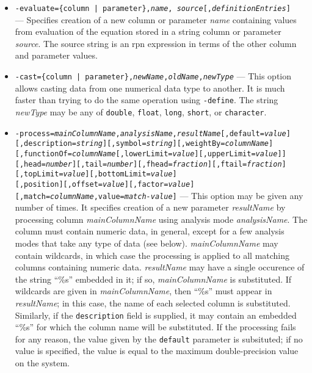 \begin{itemize}
\begin{itemize}
\begin{itemize}
        \item {\tt -evaluate=\{column | parameter\},{\em name},{\em
source}[,{\em definitionEntries}]}\\ --- Specifies creation of a new column or parameter {\em name}
containing values from evaluation of the equation stored in a string column or parameter {\em source}.
The source string is an rpn expression in terms of the other column and parameter values.

        \item {\tt -cast=\{column | parameter\},{\em newName},{\em oldName},{\em newType}} --- This option allows
casting data from one numerical data type to another.  It is much faster than trying to do the same operation using
{\tt -define}.  The string {\em newType} may be any of {\tt double}, {\tt float}, {\tt long}, {\tt short}, or
{\tt character}.

        \item {\tt -process={\em mainColumnName},{\em analysisName},{\em resultName}[,default={\em value}]}
\\{\tt [,description={\em string}][,symbol={\em string}][,weightBy={\em columnName}]}
\\{\tt [,functionOf={\em columnName}[,lowerLimit={\em value}][,upperLimit={\em value}]]}
\\{\tt [,head={\em number}][,tail={\em number}][,fhead={\em fraction}][,ftail={\em fraction}]}
\\{\tt [,topLimit={\em value}][,bottomLimit={\em value}]} 
\\{\tt [,position][,offset={\em value}][,factor={\em value}]}
\\{\tt [,match={\em columnName},value={\em match-value}]} --- This option may be given
any number of times.  It specifies creation of a new parameter {\em resultName} by processing
column {\em mainColumnName} using analysis mode {\em analysisName}.  The column must contain
numeric data, in general, except for a few analysis modes that take any type of data (see below). {\em
mainColumnName} may contain wildcards, in which case the processing is applied to all matching
columns containing numeric data.  {\em resultName} may have a single occurence of the string
``\%s'' embedded in it; if so, {\em mainColumnName} is substituted.  If wildcards are given in
{\em mainColumnName}, then ``\%s'' must appear in {\em resultName}; in this case, the name of
each selected column is substituted.  Similarly, if the {\tt description} field is supplied,
it may contain an embedded ``\%s'' for which the column name will be substituted.
If the processing fails for any reason, the value given by the {\tt default} parameter is subsituted;
if no value is specified, the value is equal to the maximum double-precision value on the system.


\end{itemize}
\end{itemize}
\end{itemize}
